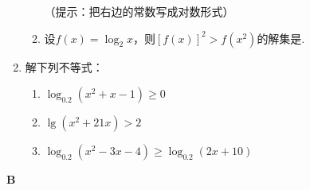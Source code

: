 \begin{enumerate}
\begin{enumerate}[(1)]
    （提示：把右边的常数写成对数形式）
    \item 设$f(x)=\log_2 x$，则$[f(x)]^2>f(x^2)$的解集是\blank.
\end{enumerate}

\item 解下列不等式：
\begin{enumerate}[(1)]
    \item $\log_{0.2}(x^2+x-1)\ge 0$
    \item $\lg (x^2+21x)>2$
    \item $\log_{0.2}(x^2-3x-4)\ge \log_{0.2}(2x+10)$
\end{enumerate}
\end{enumerate}

\begin{center}
    \bfseries B
\end{center}

